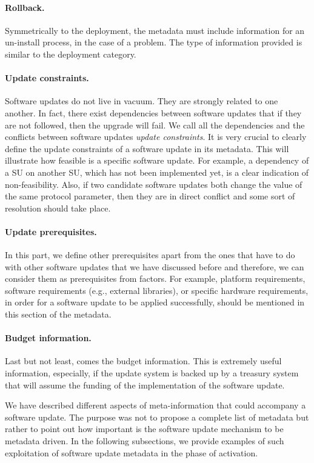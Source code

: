 \paragraph{Rollback.} Symmetrically to the deployment, the metadata must include information for an un-install process, in the case of a problem. The type of information provided is similar to the deployment category.
\paragraph{Update constraints.} Software updates do not live in vacuum. They are strongly related to one another. In fact, there exist dependencies between software updates that if they are not followed, then the upgrade will fail. We call all the dependencies and the conflicts between software updates \emph{update constraints}. It is very crucial to clearly define the update constraints of a software update in its metadata. This will illustrate how feasible is a specific software update. For example, a dependency of a SU on another SU, which has not been implemented yet, is a clear indication of non-feasibility. Also, if two candidate software updates both change the value of the same protocol parameter, then they are in direct conflict and some sort of resolution should take place.
\paragraph{Update prerequisites.} In this part, we define other prerequisites apart from the ones that have to do with other software updates that we have discussed before and therefore, we can consider them as prerequisites from  factors. For example, platform requirements, software requirements (e.g., external libraries), or specific hardware requirements, in order for a software update to be applied successfully, should be mentioned in this section of the metadata.
\paragraph{Budget information.} Last but not least, comes the budget information. This is extremely useful information, especially, if the update system is backed up by a treasury system \cite{treasury} that will assume the funding of the implementation of the software update.

We have described different aspects of meta-information that could accompany a software update. The purpose was not to propose a complete list of metadata but rather to point out how important is the software update mechanism to be metadata driven. In the following subsections, we provide examples of such exploitation of software update metadata in the phase of activation.


